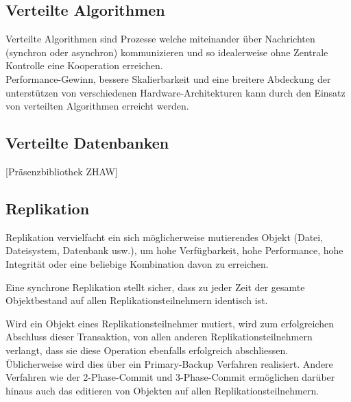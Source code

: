 \documentclass[oneside,11pt,parskip=half,ngerman]{scrreprt}
\begin{document}
\subsection{Verteilte Algorithmen}\label{verteilte-algorithmen}

Verteilte Algorithmen sind Prozesse welche miteinander über Nachrichten
(synchron oder asynchron) kommunizieren und so idealerweise ohne
Zentrale Kontrolle eine Kooperation erreichen.
\autocite{ethdistribalgo}\\Performance-Gewinn, bessere Skalierbarkeit
und eine breitere Abdeckung der unterstützen von verschiedenen
Hardware-Architekturen kann durch den Einsatz von verteilten Algorithmen
erreicht werden.

\subsection{Verteilte Datenbanken}\label{verteilte-datenbanken}

{[}Präsenzbibliothek ZHAW{]}

\subsection{Replikation}\label{replikation}

Replikation vervielfacht ein sich möglicherweise mutierendes Objekt
(Datei, Dateisystem, Datenbank usw.), um hohe Verfügbarkeit, hohe
Performance, hohe Integrität oder eine beliebige Kombination davon zu
erreichen. \autocite[ p.~19]{SWB-327013990}


Eine synchrone Replikation stellt sicher, dass zu jeder Zeit der gesamte
Objektbestand auf allen Replikationsteilnehmern identisch ist.

Wird ein Objekt eines Replikationsteilnehmer mutiert, wird zum
erfolgreichen Abschluss dieser Transaktion, von allen anderen
Replikationsteilnehmern verlangt, dass sie diese Operation ebenfalls
erfolgreich abschliessen.\\Üblicherweise wird dies über ein
Primary-Backup Verfahren realisiert. Andere Verfahren wie der
2-Phase-Commit und 3-Phase-Commit ermöglichen darüber hinaus auch das
editieren von Objekten auf allen Replikationsteilnehmern. \autocite[
p.~23ff, 134ff]{SWB-327013990}
\end{document}
